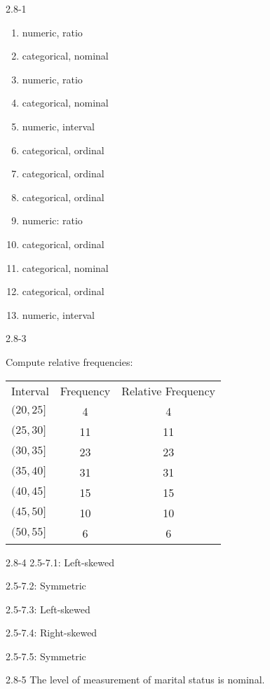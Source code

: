 \begin{exsol@solution}{2.8-1}
    \begin{enumerate}
	  \item   numeric, ratio
    \item  categorical, nominal
    \item  numeric, ratio
    \item  categorical, nominal
    \item  numeric, interval
    \item  categorical, ordinal
    \item  categorical, ordinal
    \item  categorical, ordinal
    \item  numeric: ratio
    \item  categorical, ordinal
    \item  categorical, nominal
    \item  categorical, ordinal
    \item  numeric, interval
  	\end{enumerate}
\end{exsol@solution}
\begin{exsol@solution}{2.8-3}

Compute relative frequencies:

\begin{tabular}{@{} lcc @{}} \hline
Interval  &  Frequency &	Relative Frequency \\
$(20, 25]$ 	&     4 & 4  \\
$(25, 30]$ 	&    11 & 11 \\
$(30, 35]$ 	&    23 & 23 \\
$(35, 40]$ 	&    31 & 31 \\
$(40, 45]$ 	&    15 & 15 \\
$(45, 50]$ 	&    10 & 10 \\
$(50, 55]$ 	&     6 & 6 \\ \hline
\end{tabular}


\end{exsol@solution}
\begin{exsol@solution}{2.8-4}
2.5-7.1: Left-skewed

2.5-7.2: Symmetric

2.5-7.3: Left-skewed

2.5-7.4: Right-skewed

2.5-7.5: Symmetric

\end{exsol@solution}
\begin{exsol@solution}{2.8-5}
	  The level of measurement of marital status is nominal.
\end{exsol@solution}
